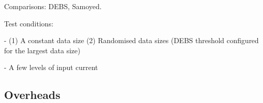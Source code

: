 Comparisons: DEBS, Samoyed.

Test conditions:
    
- (1) A constant data size (2) Randomised data sizes (DEBS threshold configured for the largest data size)

- A few levels of input current

\subsection{Overheads}




